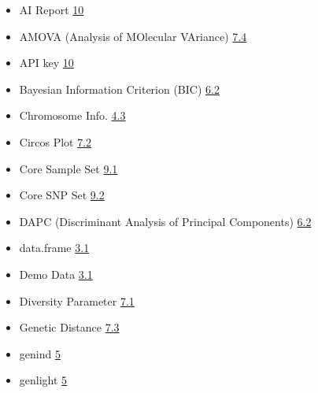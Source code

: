 \documentclass[
]{book}
\begin{document}
\begin{itemize}
\item
  AI Report \href{https://teddyenn.github.io/ShiNyP_guide.io/sec-ai-report.html\#sec-ai-report}{10}
\item
  AMOVA (Analysis of MOlecular VAriance) \href{https://teddyenn.github.io/ShiNyP_guide.io/sec-genetic-diversity.html\#amova-analysis-of-molecular-variance}{7.4}
\item
  API key \href{https://teddyenn.github.io/ShiNyP_guide.io/sec-ai-report.html\#step-2-ai-driven-report}{10}
\item
  Bayesian Information Criterion (BIC) \href{https://teddyenn.github.io/ShiNyP_guide.io/sec-population-structure.html\#step-2-dapc-analysis}{6.2}
\item
  Chromosome Info. \href{https://teddyenn.github.io/ShiNyP_guide.io/sec-data-qc.html\#snp-density}{4.3}
\item
  Circos Plot \href{https://teddyenn.github.io/ShiNyP_guide.io/sec-genetic-diversity.html\#circos-plot}{7.2}
\item
  Core Sample Set \href{https://teddyenn.github.io/ShiNyP_guide.io/sec-core-collection.html\#core-sample-set}{9.1}
\item
  Core SNP Set \href{https://teddyenn.github.io/ShiNyP_guide.io/sec-core-collection.html\#core-snp-set}{9.2}
\item
  DAPC (Discriminant Analysis of Principal Components) \href{https://teddyenn.github.io/ShiNyP_guide.io/sec-population-structure.html\#dapc-discriminant-analysis-of-principal-components}{6.2}
\item
  data.frame \href{https://teddyenn.github.io/ShiNyP_guide.io/sec-data-input.html\#step-2-transform-to-data.frame}{3.1}
\item
  Demo Data \href{https://teddyenn.github.io/ShiNyP_guide.io/sec-data-input.html\#step-1-input-your-vcf-file}{3.1}
\item
  Diversity Parameter \href{https://teddyenn.github.io/ShiNyP_guide.io/sec-genetic-diversity.html\#diversity-parameter}{7.1}
\item
  Genetic Distance \href{https://teddyenn.github.io/ShiNyP_guide.io/sec-genetic-diversity.html\#genetic-distance}{7.3}
\item
  genind \href{https://teddyenn.github.io/ShiNyP_guide.io/sec-data-conversion.html\#step-1-transform-data.frame-to-genind}{5}
\item
  genlight \href{https://teddyenn.github.io/ShiNyP_guide.io/sec-data-conversion.html\#step-2-transform-genind-to-genlight}{5}

\end{itemize}
\end{document}
